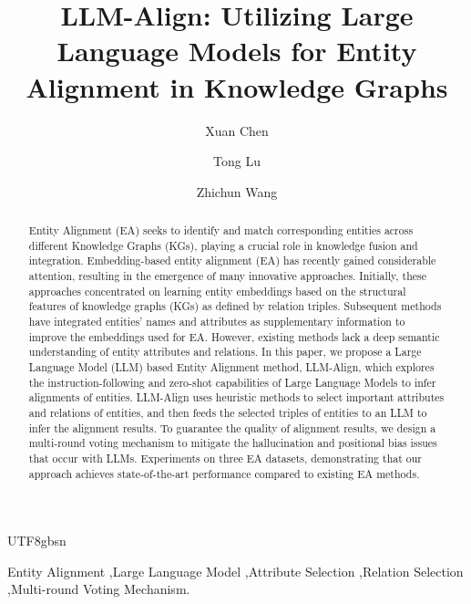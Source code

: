 \documentclass[preprint,12pt]{elsarticle}
\renewcommand{\thefigure}{\arabic{figure}}
\begin{document}
\begin{CJK}{UTF8}{gbsn}
\begin{frontmatter}


\title{LLM-Align: Utilizing Large Language Models for Entity Alignment in Knowledge Graphs}

 \author[a]{Xuan Chen}
 \author[a]{Tong Lu}
 \author[a,b]{Zhichun Wang}



\renewcommand{\thefigure}{\arabic{figure}}
\begin{abstract}
Entity Alignment (EA) seeks to identify and match corresponding entities across different Knowledge Graphs (KGs), playing a crucial role in knowledge fusion and integration. Embedding-based entity alignment (EA) has recently gained considerable attention, resulting in the emergence of many innovative approaches. Initially, these approaches concentrated on learning entity embeddings based on the structural features of knowledge graphs (KGs) as defined by relation triples. Subsequent methods have integrated entities' names and attributes as supplementary information to improve the embeddings used for EA. However, existing methods lack a deep semantic understanding of entity attributes and relations. 
In this paper, we propose a Large Language Model (LLM) based Entity Alignment method, LLM-Align, which explores the instruction-following and zero-shot capabilities of Large Language Models to infer alignments of entities. LLM-Align uses heuristic methods to select important attributes and relations of entities, and then feeds the selected  triples of entities to an LLM to infer the alignment results. To guarantee the quality of alignment results, we design a multi-round voting mechanism to mitigate the hallucination and positional bias issues that occur with LLMs.
Experiments on three EA datasets, demonstrating that our
approach achieves state-of-the-art performance compared to existing EA methods.
\end{abstract}


\begin{keyword}
Entity Alignment \sep  Large Language Model  \sep Attribute Selection \sep Relation Selection \sep Multi-round Voting Mechanism.
\end{keyword}


\end{frontmatter}
\end{CJK}
\end{document}
